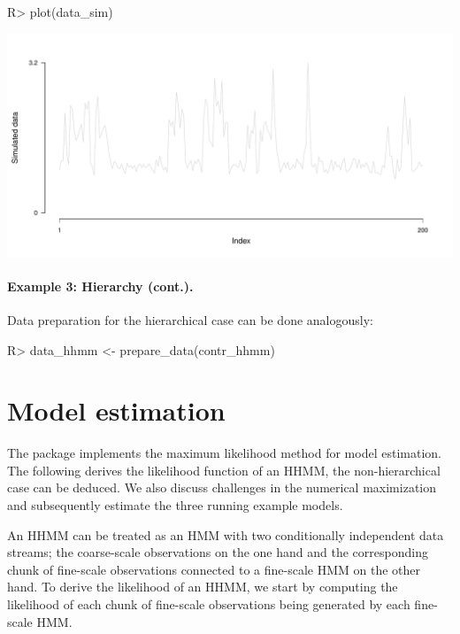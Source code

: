\documentclass[article]{jss}
\begin{document}
%
\begin{Schunk}
\begin{Sinput}
R> plot(data_sim)
\end{Sinput}
\end{Schunk}
\includegraphics{fhmm_oelschlaeger_adam_michels-sim-data-ts}
%

\paragraph{Example 3: Hierarchy (cont.).}

Data preparation for the hierarchical case can be done analogously:

%
\begin{Schunk}
\begin{Sinput}
R> data_hhmm <- prepare_data(contr_hhmm)
\end{Sinput}
\end{Schunk}
%

\section{Model estimation} \label{sec:model_estimation} %

The  package implements the maximum likelihood method for model estimation. The following derives the likelihood function of an HHMM, the non-hierarchical case can be deduced. We also discuss challenges in the numerical maximization and subsequently estimate the three running example models.

An HHMM can be treated as an HMM with two conditionally independent data streams; the coarse-scale observations on the one hand and the corresponding chunk of fine-scale observations connected to a fine-scale HMM on the other hand. To derive the likelihood of an HHMM, we start by computing the likelihood of each chunk of fine-scale observations being generated by each fine-scale HMM. 
\end{document}
